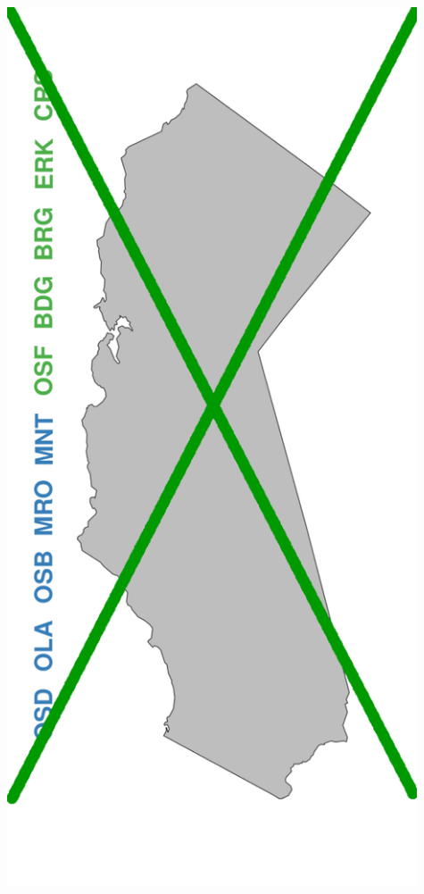 \documentclass[a0paper,portrait]{baposter}
\begin{document}
\begin{poster}
{\begin{minipage}[h!]{0.19\textwidth}
	        \includegraphics[width=0.91\textwidth]{../pictures/mapFullHalfHalfNotGreen.pdf}
	\end{minipage}
	\begin{minipage}[h!]{0.19\textwidth}
	        \hspace*{0.125cm}

\end{minipage}}
\end{poster}
\end{document}

